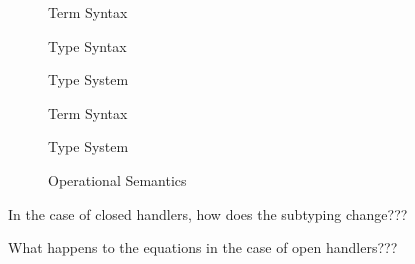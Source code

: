 \documentclass{article}
\begin{document}
\begin{figure}[]
  \centering
  
  \caption{\EEFF Term Syntax}
\end{figure}

\begin{figure}[]
  \centering
  
  \caption{\EEFF Type Syntax}
\end{figure}

\begin{figure}[]
  \centering
  
  \caption{\EEFF Type System}
\end{figure}

\begin{figure}[]
  \centering
  
  \caption{\EEFF Term Syntax}
\end{figure}

\begin{figure}[]
  \centering
  
  \caption{\EEFF Type System}
\end{figure}


\begin{figure}[]
  \centering
  
  \caption{\EEFF Operational Semantics}
\end{figure}

In the case of closed handlers, how does the subtyping change???

What happens to the equations in the case of open handlers???
\end{document}
